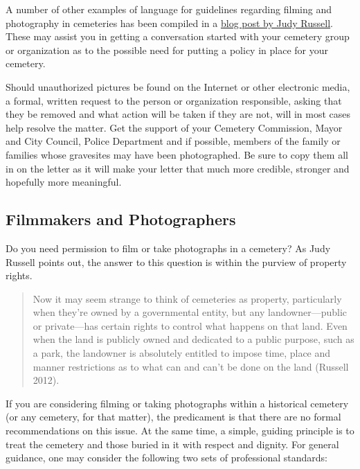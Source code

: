 \documentclass[]{article}
\begin{document}
A number of other examples of language for guidelines regarding filming
and photography in cemeteries has been compiled in a
\href{http://www.legalgenealogist.com/blog/2012/10/22/cemetery-photos-permission-required/}{blog
post by Judy Russell}. These may assist you in getting a conversation
started with your cemetery group or organization as to the possible need
for putting a policy in place for your cemetery.

Should unauthorized pictures be found on the Internet or other
electronic media, a formal, written request to the person or
organization responsible, asking that they be removed and what action
will be taken if they are not, will in most cases help resolve the
matter. Get the support of your Cemetery Commission, Mayor and City
Council, Police Department and if possible, members of the family or
families whose gravesites may have been photographed. Be sure to copy
them all in on the letter as it will make your letter that much more
credible, stronger and hopefully more meaningful.

\subsection{Filmmakers and
Photographers}\label{filmmakers-and-photographers}

Do you need permission to film or take photographs in a cemetery? As
Judy Russell points out, the answer to this question is within the
purview of property rights.

\begin{quote}
Now it may seem strange to think of cemeteries as property, particularly
when they're owned by a governmental entity, but any landowner---public
or private---has certain rights to control what happens on that land.
Even when the land is publicly owned and dedicated to a public purpose,
such as a park, the landowner is absolutely entitled to impose time,
place and manner restrictions as to what can and can't be done on the
land (Russell 2012).
\end{quote}

If you are considering filming or taking photographs within a historical
cemetery (or any cemetery, for that matter), the predicament is that
there are no formal recommendations on this issue. At the same time, a
simple, guiding principle is to treat the cemetery and those buried in
it with respect and dignity. For general guidance, one may consider the
following two sets of professional standards:
\end{document}
